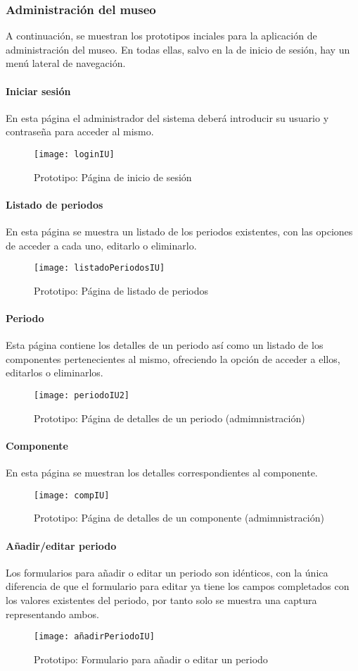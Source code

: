 \subsubsection{Administración del museo}
A continuación, se muestran los prototipos inciales para la aplicación de administración del museo. En todas ellas, salvo en la de inicio de sesión, hay un menú lateral de navegación. 
\paragraph*{Iniciar sesión}\label{iu:login}
En esta página el administrador del sistema deberá introducir su usuario y contraseña para acceder al mismo.
\begin{figure}[H]
\centering
\texttt{[image: loginIU]}
\caption{Prototipo: Página de inicio de sesión}
\end{figure}
\paragraph*{Listado de periodos}\label{iu:list-periods}
En esta página se muestra un listado de los periodos existentes, con las opciones de acceder a cada uno, editarlo o eliminarlo.
\begin{figure}[H]
\centering
\texttt{[image: listadoPeriodosIU]}
\caption{Prototipo: Página de listado de periodos}
\end{figure}
\paragraph*{Periodo}\label{iu:period}
Esta página contiene los detalles de un periodo así como un listado de los componentes pertenecientes al mismo, ofreciendo la opción de acceder a ellos, editarlos o eliminarlos.
\begin{figure}[H]
\centering
\texttt{[image: periodoIU2]}
\caption{Prototipo: Página de detalles de un periodo (admimnistración)}
\end{figure}
\paragraph*{Componente}\label{iu:my-comp}
En esta página se muestran los detalles correspondientes al componente.
\begin{figure}[H]
\centering
\texttt{[image: compIU]}
\caption{Prototipo: Página de detalles de un componente (admimnistración)}
\end{figure}
\paragraph*{Añadir/editar periodo}\label{iu:add-period}
Los formularios para añadir o editar un periodo son idénticos, con la única diferencia de que el formulario para editar ya tiene los campos completados con los valores existentes del periodo, por tanto solo se muestra una captura representando ambos.
\begin{figure}[H]
\centering
\texttt{[image: añadirPeriodoIU]}
\caption{Prototipo: Formulario para añadir o editar un periodo}
\end{figure}
